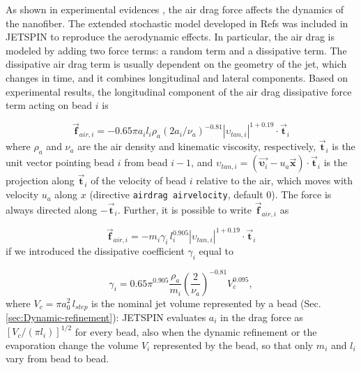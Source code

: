 As shown in experimental evidences \cite{spinning1991science}, the
air drag force affects the dynamics of the nanofiber. The extended
stochastic model developed in Refs \cite{lauricella2016refinement,Lauricella2015dissipative,lauricella2015nonlinear}
was included in JETSPIN to reproduce the aerodynamic effects. In particular,
the air drag is modeled by adding two force terms: a random term and
a dissipative term. The dissipative air drag term is usually dependent
on the geometry of the jet, which changes in time, and it combines
longitudinal and lateral components. Based on experimental results\cite{spinning1991science},
the longitudinal component of the air drag dissipative force term
acting on bead $i$ is

\begin{equation}
\vec{\textbf{f}}_{air,i}=-0.65\pi a_{i}l_{i}\rho_{a}\left(2a_{i}/\nu_{a}\right)^{-0.81}\left|\upsilon_{tan,i}\right|^{1+0.19}\cdot\vec{\textbf{t}}_{i}
\end{equation}
where $\rho_{a}$ and $\nu_{a}$ are the air density and kinematic
viscosity, respectively, $\vec{\textbf{t}}_{i}$ is the unit vector
pointing bead $i$ from bead $i-1$, and $\upsilon_{tan,i}=\left(\vec{\boldsymbol{\upsilon}_{i}}-u_{a}\vec{\textbf{x}}\right)\cdot\vec{\textbf{t}}_{i}$
is the projection along $\vec{\textbf{t}}_{i}$ of the velocity of
bead $i$ relative to the air, which moves with velocity $u_{a}$ along
$x$ (directive \texttt{airdrag airvelocity}, default 0). The force
is always directed along $-\vec{\textbf{t}}_{i}$. Further, it is possible to write
$\vec{\textbf{f}}_{air,i}$ as

\begin{equation}
\vec{\textbf{f}}_{air,i}=-m_{i}\gamma_{i}\,l_{i}^{0.905}\left|\upsilon_{tan,i}\right|^{1+0.19}\cdot\vec{\textbf{t}}_{i}
\end{equation}
if we introduced the dissipative coefficient $\gamma_{i}$ equal to

\begin{equation}
\gamma_{i}=0.65\pi^{0.905}\frac{\rho_{a}}{m_{i}}\left(\frac{2}{\nu_{a}}\right)^{-0.81}V_{c}^{0.095},\label{eq:fric_dissip}
\end{equation}
where $V_{c}=\pi a_{0}^{2}\,l_{step}$ is the nominal jet volume represented
by a bead (Sec. \ref{sec:Dynamic-refinement}): JETSPIN evaluates $a_{i}$
in the drag force as $\left[V_{c}/\left(\pi l_{i}\right)\right]^{1/2}$
for every bead, also when the dynamic refinement or the evaporation
change the volume $V_{i}$ represented by the bead, so that only $m_{i}$
and $l_{i}$ vary from bead to bead.

